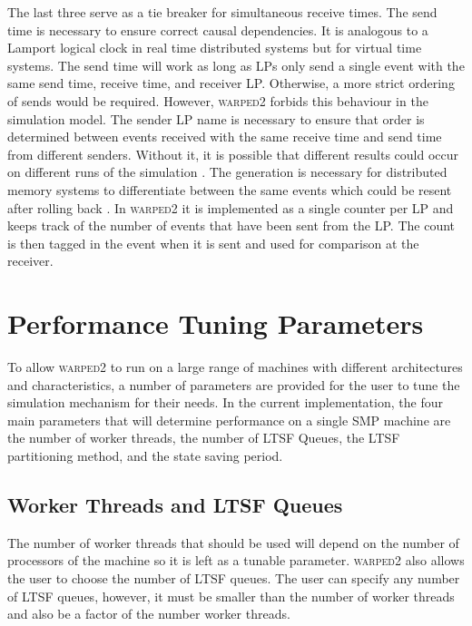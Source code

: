 \documentclass[11pt]{book}
\begin{document}
\noindent %
The last three serve as a tie breaker for simultaneous receive times.  The send time is necessary to
ensure correct causal dependencies.  It is analogous to a Lamport logical clock\cite{lamport-78} in
real time distributed systems but for virtual time systems.  The send time will work as long as LPs
only send a single event with the same send time, receive time, and receiver LP.  Otherwise, a more
strict ordering of sends would be required.  However, \textsc{warped2} forbids this behaviour in the
simulation model.  The sender LP name is necessary to ensure that order is determined between events
received with the same receive time and send time from different senders.  Without it, it is
possible that different results could occur on different runs of the simulation \cite{ronngren-99}.
The generation is necessary for distributed memory systems to differentiate between the same events
which could be resent after rolling back \cite{ronngren-99}.  In \textsc{warped2} it is implemented
as a single counter per LP and keeps track of the number of events that have been sent from the LP.
The count is then tagged in the event when it is sent and used for comparison at the receiver.

\section{Performance Tuning Parameters}

To allow \textsc{warped2} to run on a large range of machines with different architectures and
characteristics, a number of parameters are provided for the user to tune the simulation mechanism
for their needs.  In the current implementation, the four main parameters that will determine
performance on a single SMP machine are the number of worker threads, the number of LTSF Queues, the
LTSF partitioning method, and the state saving period.

\subsection{Worker Threads and LTSF Queues}

The number of worker threads that should be used will depend on the number of processors of the
machine so it is left as a tunable parameter.  \textsc{warped2} also allows the user to choose the
number of LTSF queues.  The user can specify any number of LTSF queues, however, it must be smaller
than the number of worker threads and also be a factor of the number worker threads.
\end{document}
